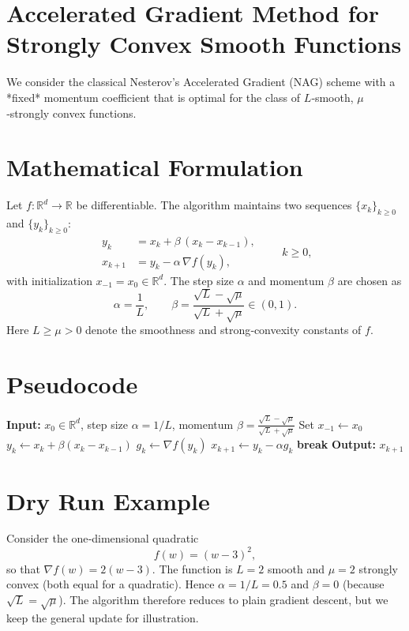 \documentclass{article}
\begin{document}
\section*{Accelerated Gradient Method for Strongly Convex Smooth Functions}
We consider the classical Nesterov’s Accelerated Gradient (NAG) scheme with a *fixed* momentum coefficient that is optimal for the class of $L$‑smooth, $\mu$‑strongly convex functions.

\section*{Mathematical Formulation}
Let $f:\mathbb{R}^d\to\mathbb{R}$ be differentiable. The algorithm maintains two sequences $\{x_k\}_{k\ge 0}$ and $\{y_k\}_{k\ge 0}$:
\[
\boxed{
\begin{aligned}
y_k &= x_k + \beta\,(x_k-x_{k-1}),\\[4pt]
x_{k+1} &= y_k - \alpha \,\nabla f(y_k),
\end{aligned}}
\qquad k\ge 0,
\]
with initialization $x_{-1}=x_0\in\mathbb{R}^d$.
The step size $\alpha$ and momentum $\beta$ are chosen as
\[
\alpha = \frac{1}{L},\qquad 
\beta = \frac{\sqrt{L}-\sqrt{\mu}}{\sqrt{L}+\sqrt{\mu}} \in (0,1).
\]
Here $L\ge\mu>0$ denote the smoothness and strong‑convexity constants of $f$.

\section*{Pseudocode}
\begin{algorithm}[H]
\caption{Accelerated Gradient (NAG) for $\mu$‑strongly convex $L$‑smooth $f$}
\begin{algorithmic}[1]
\State \textbf{Input:} $x_0\in\mathbb{R}^d$, step size $\alpha=1/L$, momentum $\beta=\frac{\sqrt{L}-\sqrt{\mu}}{\sqrt{L}+\sqrt{\mu}}$
\State Set $x_{-1}\gets x_0$
    \State $y_k \gets x_k + \beta (x_k-x_{k-1})$ 
    \State $g_k \gets \nabla f(y_k)$
    \State $x_{k+1} \gets y_k - \alpha g_k$ 
        \State \textbf{break}
    \EndIf
\EndFor
\State \textbf{Output:} $x_{k+1}$
\end{algorithmic}
\end{algorithm}

\section*{Dry Run Example}
Consider the one‑dimensional quadratic
\[
f(w) = (w-3)^2,
\]
so that $\nabla f(w)=2(w-3)$. The function is $L=2$ smooth and $\mu=2$ strongly convex (both equal for a quadratic). Hence $\alpha=1/L=0.5$ and $\beta=0$ (because $\sqrt{L}=\sqrt{\mu}$). The algorithm therefore reduces to plain gradient descent, but we keep the general update for illustration.
\end{document}
